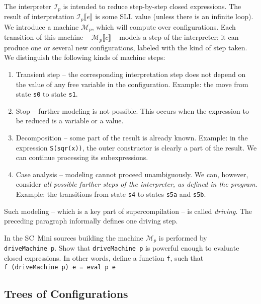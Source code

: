 The interpreter $\mathcal{I}_p$ is intended to reduce step-by-step closed expressions. 
The result of interpretation $\mathcal{I}_p\llbracket e \rrbracket$ is some SLL value (unless there is an infinite loop).
We introduce a machine $\mathcal{M}_p$, which will compute over configurations. 
Each transition of this machine -- $\mathcal{M}_p \llbracket c \rrbracket$ -- models a step of the interpreter;
it can produce one or several new configurations, labeled with the kind of step taken.
We distinguish the following kinds of machine steps:
\begin{enumerate}
  \item Transient step -- the corresponding interpretation step does not depend on
  the value of any free variable in the configuration.
  Example: the move from state \texttt{s0} to state \texttt{s1}.
  \item Stop -- further modeling is not possible. 
  This occurs when the expression to be reduced is a variable or a value.
  \item Decomposition -- some part of the result is already known.
  Example: in the expression \texttt{S(sqr(x))},
  the outer constructor is clearly a part of the result. 
  We can continue processing its subexpressions.
  \item Case analysis -- modeling cannot proceed unambiguously.
  We can, however, consider \emph{all possible further steps of the interpreter, as defined in the program}.
  Example: the transitions from state \texttt{s4} to states \texttt{s5a} and \texttt{s5b}.
\end{enumerate}

Such modeling -- which is a key part of supercompilation -- is called \emph{driving}. 
The preceding paragraph informally defines one driving step.

\begin{exercise}
In the SC~Mini sources building the machine $\mathcal{M}_p$ is performed by \texttt{driveMachine~p}.
Show that \texttt{driveMachine~p} is powerful enough to evaluate closed expressions. 
In other words, define a function \texttt{f}, such that
\\ \texttt{f (driveMachine p) e = eval p e}
\end{exercise}


\subsection{Trees of Configurations}

